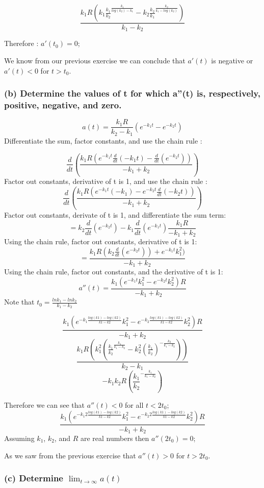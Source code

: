 \documentclass[]{article}
\begin{document}
\[\frac{k_1 R (k_1 \frac{k_1}{k_2}^{\frac{k_1}{log(k_2)-k_1}} - k_2 \frac{k_2}{k_1}^{\frac{k_2}{k_1 - log(k_2)}})}{k_1 - k_2}\]

Therefore : \(a'(t_0) = 0\);

We know from our previous exercise we can conclude that \(a'(t)\) is
negative or \(a'(t) < 0\) for \(t > t_0\).

\subsubsection{(b) Determine the values of t for which a''(t) is,
respectively, positive, negative, and
zero.}\label{b-determine-the-values-of-t-for-which-at-is-respectively-positive-negative-and-zero.}

\[a(t) = \frac{k_1 R}{k_2-k_1}(e^{-k_1t} - e^{-k_2t})\] Differentiate
the sum, factor constants, and use the chain rule :

\[\frac{d}{dt}(\frac{k_1 R(e^{-k_1t}\frac{d}{dt}(-k_1t)-\frac{d}{dt}(e^{-k_2t}))}{-k_1 + k_2})\]
Factor out constants, derivative of t is 1, and use the chain rule :
\[\frac{d}{dt}(\frac{k_1R(e^{-k_1 t}(-k_1)- e^{-k_2t}\frac{d}{dt}(-k_2t))}{-k_1 + k_2})\]
Factor out constants, derivate of t is 1, and differentiate the sum
term:
\[= k_2 \frac{d}{dt}(e^{-k_2 t})-k_1\frac{d}{dt}(e^{-k_1t})\frac{k_1R}{-k_1 + k_2}\]
Using the chain rule, factor out constants, derivative of t is 1:
\[=\frac{k_1 R (k_2 \frac{d}{dt}(e^{-k_2t}))+e^{-k_1t}k_1^2)}{-k_1 + k_2}\]
Using the chain rule, factor out constants, and the derivative of t is
1: \[a''(t) = \frac{k_1(e^{-k_1 t}k_1^2-e^{-k_2 t}k_2^2)R}{-k_1+k_2}\]
Note that \(t_0 = \frac{ln k_1 - ln k_2}{k_1 - k_2}\)

\[\frac{k_1(e^{-k_1 \frac{log(k1) - log(k2)}{k1 - k2}}k_1^2-e^{-k_2 \frac{log(k1) - log(k2)}{k1 - k2}}k_2^2)R}{-k_1+k_2}\]
\[\frac{k_1 R(k_1^2(\frac{k_1}{k_2}^{\frac{k_1}{k_1 - k_2}} - k_2^2(\frac{k_1}{k_2})^{-\frac{k_2}{k_1 - k_2}}))}{k_2 - k_1}\]
\[-k_1 k_2 R (\frac{k_1}{k_2}^{-\frac{k_1}{k_1 - k_2}})\]

Therefore we can see that \(a''(t) < 0\) for all \(t < 2t_0\);
\[\frac{k_1(e^{-k_1 2 \frac{log(k1) - log(k2)}{k1 - k2}}k_1^2-e^{-k_2 2\frac{log(k1) -log(k2)}{k1 - k2}}k_2^2)R}{-k_1+k_2}\]
Assuming \(k_1\), \(k_2\), and \(R\) are real numbers then
\(a''(2t_0) =0\);

As we saw from the previous exercise that \(a''(t) > 0\) for
\(t > 2t_0\).

\subsubsection{\texorpdfstring{(c) Determine
\(\lim_{t\to\infty}a(t)\)}{(c) Determine \textbackslash{}lim\_\{t\textbackslash{}to\textbackslash{}infty\}a(t)}}\label{c-determine-lim_ttoinftyat}
\end{document}
